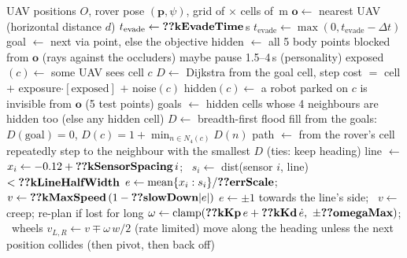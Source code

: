 \begin{algorithm}[htbp]
\caption{Intruder rover, one tick (). Short forms: UAV: uncrewed aerial vehicle.}
\label{alg:intruder}
\footnotesize
\begin{algorithmic}[1]
\Require UAV positions $O$, rover pose $(\mathbf{p},\psi)$, grid of $\times$ cells of \,m
\State $\mathbf{o}\gets$ nearest UAV (horizontal distance $d$)
 \State $t_{\mathrm{evade}}\gets\gv{kEvadeTime}$\,s 
\Else \State $t_{\mathrm{evade}}\gets\max(0,t_{\mathrm{evade}}-\Delta t)$ \EndIf
{} \State goal $\gets$ next via point, else the objective \EndIf
{} \State {} \EndIf
\State {}
\State hidden $\gets$ all 5 body points blocked from $\mathbf{o}$ (rays against the occluders)
 \State maybe pause 1.5--4\,s (personality) \EndIf
\Statex
{}
    \State exposed$(c)\gets$ some UAV sees cell $c$
    \State $D\gets$ Dijkstra from the goal cell, step cost $=$ cell $+$ exposure$\cdot[\text{exposed}]$ $+$ noise$(c)$
  \Else
    \State hidden$(c)\gets$ a robot parked on $c$ is invisible from $\mathbf{o}$ (5 test points)
    \State goals $\gets$ hidden cells whose 4 neighbours are hidden too (else any hidden cell)
    \State $D\gets$ breadth-first flood fill from the goals: $D(\text{goal})=0$, $D(c)=1+\min_{n\in N_4(c)}D(n)$
  \EndIf
  \State path $\gets$ from the rover's cell repeatedly step to the neighbour with the smallest $D$ (ties: keep heading)
  \State line $\gets$ 
\EndProcedure
{}
   \State $x_i\gets-0.12+\gv{kSensorSpacing}\,i$; \ $s_i\gets$ dist(sensor $i$, line) $<\gv{kLineHalfWidth}$ \EndFor
   \State $e\gets\mathrm{mean}\{x_i: s_i\}/\gv{errScale}$; \ $v\gets\gv{kMaxSpeed}\,(1-\gv{slowDown}|e|)$
  \Else \State $e\gets\pm1$ towards the line's side; \ $v\gets$ creep; re-plan if lost for long \EndIf
  \State $\omega\gets\mathrm{clamp}(\gv{kKp}\,e+\gv{kKd}\,\dot e,\ \pm\gv{omegaMax})$; \ wheels $v_{L,R}\gets v\mp\omega\,w/2$ (rate limited)
  \State move along the heading unless the next position collides (then pivot, then back off)
\EndProcedure
\end{algorithmic}
\end{algorithm}

